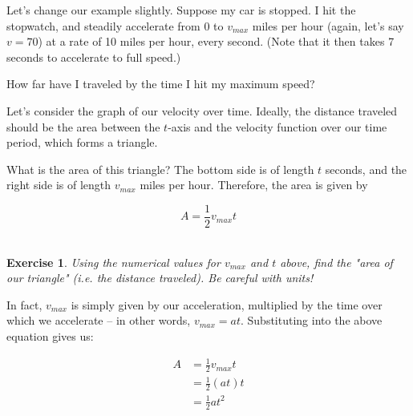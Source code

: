 \documentclass{article}
\newtheorem{exercise}{\\ \bf Exercise}
\begin{document}
Let's change our example slightly. Suppose my car is stopped. I hit the stopwatch, and steadily accelerate from $0$ to $v_{max}$ miles per hour (again, let's say $v = 70$) at a rate of 10 miles per hour, every second. (Note that it then takes 7 seconds to accelerate to full speed.) 

How far have I traveled by the time I hit my maximum speed? %

Let's consider the graph of our velocity over time. Ideally, the distance traveled should be the area between the $t$-axis and the velocity function over our time period, which forms a triangle. 


What is the area of this triangle? The bottom side is of length $t$ seconds, and the right side is of length $v_{max}$ miles per hour. Therefore, the area is given by 

\begin{equation}
A = \frac{1}{2} v_{max} t
\end{equation}


\begin{exercise}
\label{const-velocity-numerical}
Using the numerical values for $v_{max}$ and $t$ above, find the "area of our triangle" (i.e. the distance traveled). Be careful with units!
\end{exercise}

In fact, $v_{max}$ is simply given by our acceleration, multiplied by the time over which we accelerate -- in other words, $v_{max} = at$. Substituting into the above equation gives us:

\begin{align*}
A &= \frac{1}{2} v_{max} t \\
&= \frac{1}{2} (a t) t \\
&= \frac{1}{2} a t^2
\end{align*}




\end{document}
